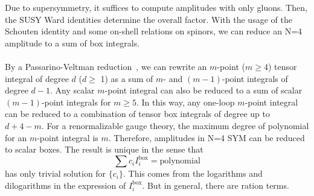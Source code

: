 Due to supersymmetry, it suffices to compute amplitudes with only gluons. 
Then, the SUSY Ward identities determine the overall factor.
With the usage of the Schouten identity and some on-shell relations on spinors, we can reduce an N=4 amplitude to a sum of box integrals. 
\\\\
By a Passarino-Veltman reduction~\cite{PASSARINO1979151}, we can rewrite an $m$-point ($m\geq 4$) tensor integral of degree $d$ ($d\geq$ 1) as a sum of $m$- and $(m-1)$-point integrals of degree $d-1$. 
Any scalar $m$-point integral can also be reduced to a sum of scalar $(m-1)$-point integrals for $m\geq 5$. 
In this way, any one-loop $m$-point integral can be reduced to a combination of tensor box integrals of degree up to $d+4-m$.
For a renormalizable gauge theory, the maximum degree of polynomial for an $m$-point integral is $m$. Therefore, amplitudes in N=4 SYM can be reduced to scalar boxes. 
The result is unique in the sense that
\begin{equation*}
\sum c_i I_i^{\mathrm{box}} =\mathrm{polynomial}
\end{equation*}
has only trivial solution for $\{c_i\}$.
This comes from the logarithms and dilogarithms in the expression of $I_i^{\mathrm{box}}$. 
But in general, there are ration terms.


